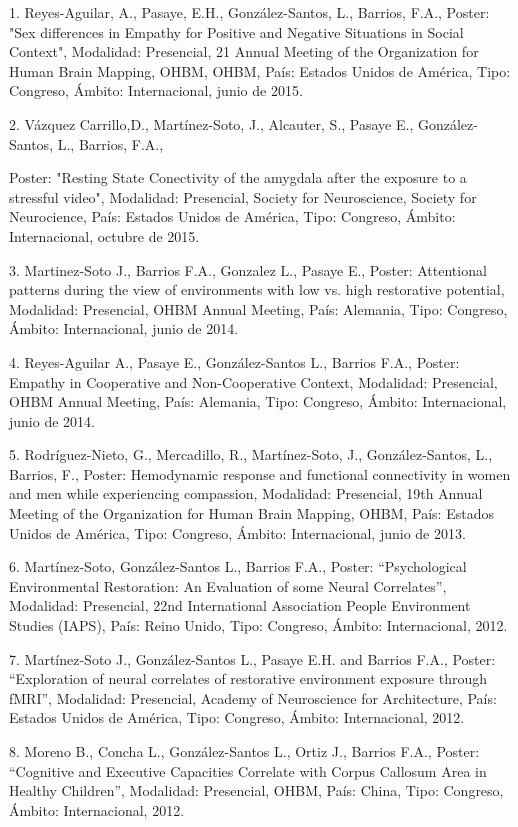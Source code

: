 1. Reyes-Aguilar, A., Pasaye, E.H., González-Santos, L., Barrios, F.A., Poster: "Sex differences in 
Empathy for Positive and Negative Situations in Social Context", Modalidad: Presencial, 21 Annual 
Meeting of the Organization for Human Brain Mapping, OHBM, OHBM, País: Estados Unidos de América, 
Tipo: Congreso, Ámbito: Internacional, junio de 2015.

2. Vázquez Carrillo,D., Martínez-Soto, J., Alcauter, S., Pasaye E., González-Santos, L., Barrios, 
F.A.,

Poster: "Resting State Conectivity of the amygdala after the exposure to a stressful video", 
Modalidad: Presencial, Society for Neuroscience, Society for Neurocience, País: Estados Unidos de 
América, Tipo: Congreso, Ámbito: Internacional, octubre de 2015.

3. Martinez-Soto J., Barrios F.A., Gonzalez L., Pasaye E., Poster: Attentional patterns during the 
view of environments with low vs. high restorative potential, Modalidad: Presencial, OHBM Annual 
Meeting, País: Alemania, Tipo: Congreso, Ámbito: Internacional, junio de 2014.

4. Reyes-Aguilar A., Pasaye E., González-Santos L., Barrios F.A., Poster: Empathy in Cooperative and 
Non-Cooperative Context, Modalidad: Presencial, OHBM Annual Meeting, País: Alemania, Tipo: Congreso, 
Ámbito: Internacional, junio de 2014.

5. Rodríguez-Nieto, G., Mercadillo, R., Martínez-Soto, J., González-Santos, L., Barrios, F., Poster: 
Hemodynamic response and functional connectivity in women and men while experiencing compassion, 
Modalidad: Presencial, 19th Annual Meeting of the Organization for Human Brain Mapping, OHBM, País: 
Estados Unidos de América, Tipo: Congreso, Ámbito: Internacional, junio de 2013.

6. Martínez-Soto, González-Santos L., Barrios F.A., Poster: “Psychological Environmental 
Restoration: An Evaluation of some Neural Correlates”, Modalidad: Presencial, 22nd International 
Association People Environment Studies (IAPS), País: Reino Unido, Tipo: Congreso, Ámbito: 
Internacional, 2012.

7. Martínez-Soto J., González-Santos L., Pasaye E.H. and Barrios F.A., Poster: “Exploration of 
neural correlates of restorative environment exposure through fMRI”, Modalidad: Presencial, Academy 
of Neuroscience for Architecture, País: Estados Unidos de América, Tipo: Congreso, Ámbito: 
Internacional, 2012.

8. Moreno B., Concha L., González-Santos L., Ortiz J., Barrios F.A., Poster: “Cognitive and 
Executive Capacities Correlate with Corpus Callosum Area in Healthy Children”, Modalidad: 
Presencial, OHBM, País: China, Tipo: Congreso, Ámbito: Internacional, 2012.

